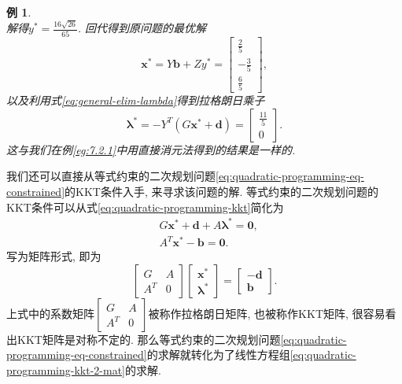 \documentclass{SBCbookchapter}
\newcommand{\V}[1]{{\bm{#1}}}
\newtheorem{eg}[thm]{例}
\numberwithin{equation}{section}
\begin{document}
\begin{eg}
\begin{equation*}
\end{equation*}
解得$y^* = \frac{16 \sqrt{26}}{65}.$ 回代得到原问题的最优解
\begin{equation*}
\V{x}^* = Y \V{b} + Z y^* = \left[\begin{matrix} \frac{2}{5} \\ - \frac{3}{5} \\ \frac{6}{5} \end{matrix}\right],
\end{equation*}
以及利用式\eqref{eq:general-elim-lambda}得到拉格朗日乘子
\begin{equation*}
\V{\lambda}^* = - Y^T \left( G \V{x}^* + \V{d} \right) = \left[\begin{matrix} \frac{11}{5} \\ 0 \end{matrix}\right].
\end{equation*}
这与我们在例\eqref{eg:7.2.1}中用直接消元法得到的结果是一样的.
\end{eg}

我们还可以直接从等式约束的二次规划问题\eqref{eq:quadratic-programming-eq-constrained}的KKT条件入手, 来寻求该问题的解. 等式约束的二次规划问题的KKT条件可以从式\eqref{eq:quadratic-programming-kkt}简化为
\begin{equation}
\label{eq:quadratic-programming-kkt-2}
\begin{aligned}
& G \V{x}^* + \V{d} + A \V{\lambda}^* = \V{0}, \\
& A^T \V{x}^* - \V{b} = \V{0}.
\end{aligned}
\end{equation}
写为矩阵形式, 即为
\begin{equation}
\label{eq:quadratic-programming-kkt-2-mat}
\begin{bmatrix} G & A \\ A^T & 0 \end{bmatrix} \begin{bmatrix} \V{x}^* \\ \V{\lambda}^* \end{bmatrix} = \begin{bmatrix} -\V{d} \\ \V{b} \end{bmatrix}.
\end{equation}
上式中的系数矩阵$\begin{bmatrix} G & A \\ A^T & 0 \end{bmatrix}$被称作拉格朗日矩阵, 也被称作KKT矩阵, 很容易看出KKT矩阵是对称不定的. 那么等式约束的二次规划问题\eqref{eq:quadratic-programming-eq-constrained}的求解就转化为了线性方程组\eqref{eq:quadratic-programming-kkt-2-mat}的求解.
\end{document}
